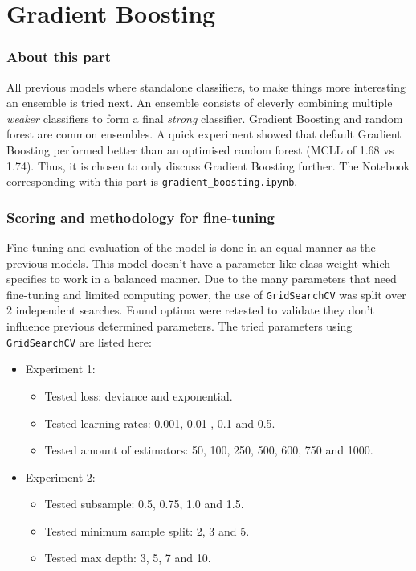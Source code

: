 \part{Gradient Boosting}
\label{part:gradien_boost}


\section{About this part}
\label{section:gb_about_part}

All previous models where standalone classifiers, to make things more interesting an ensemble is tried next.
An ensemble consists of cleverly combining multiple \textit{weaker} classifiers to form a final \textit{strong} classifier.
Gradient Boosting and random forest are common ensembles.
A quick experiment showed that default Gradient Boosting performed better than an optimised random forest (MCLL of 1.68 vs 1.74).
Thus, it is chosen to only discuss Gradient Boosting further.
The Notebook corresponding with this part is \texttt{gradient\_boosting.ipynb}.


\section{Scoring and methodology for fine-tuning}
\label{section:gb_methodology}

Fine-tuning and evaluation of the model is done in an equal manner as the previous models.
This model doesn't have a parameter like class weight which specifies to work in a balanced manner.
Due to the many parameters that need fine-tuning and limited computing power, the use of \texttt{GridSearchCV} was split over 2 independent searches.
Found optima were retested to validate they don't influence previous determined parameters.
The tried parameters using \texttt{GridSearchCV} are listed here:
\begin{itemize}
    \item Experiment 1:
    \begin{itemize}
        \item Tested loss: deviance and exponential.
        \item Tested learning rates: 0.001, 0.01 , 0.1 and 0.5.
        \item Tested amount of estimators: 50, 100, 250, 500, 600, 750 and 1000.
    \end{itemize}
    \item Experiment 2:
    \begin{itemize}
        \item Tested subsample: 0.5, 0.75, 1.0 and 1.5.
        \item Tested minimum sample split: 2, 3 and 5.
        \item Tested max depth: 3, 5, 7 and 10.
    \end{itemize}
\end{itemize}

